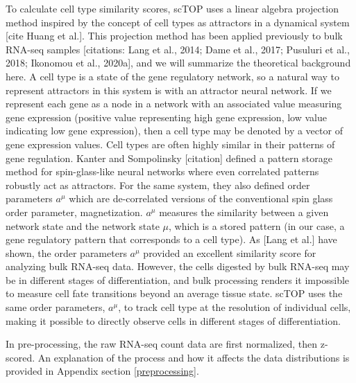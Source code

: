 \documentclass[aps,superscriptaddress, notitlepage,longbibliography]{revtex4-1}
\begin{document}
To calculate cell type similarity scores, scTOP uses a linear algebra projection method inspired by the concept of cell types as attractors in a dynamical system [cite Huang et al.]. This projection method has been applied previously to bulk RNA-seq samples [citations: Lang et al., 2014; Dame et al., 2017; Pusuluri et al., 2018; Ikonomou et al., 2020a], and we will summarize the theoretical background here. A cell type is a state of the gene regulatory network, so a natural way to represent attractors in this system is with an attractor neural network. If we represent each gene as a node in a network with an associated value measuring gene expression (positive value representing high gene expression, low value indicating low gene expression), then a cell type may be denoted by a vector of gene expression values. Cell types are often highly similar in their patterns of gene regulation. Kanter and Sompolinsky [citation] defined a pattern storage method for spin-glass-like neural networks where even correlated patterns robustly act as attractors. For the same system, they also defined order parameters $a^{\mu}$ which are de-correlated versions of the conventional spin glass order parameter, magnetization. $a^{\mu}$ measures the similarity between a given network state and the network state $\mu$, which is a stored pattern (in our case, a gene regulatory pattern that corresponds to a cell type). As [Lang et al.] have shown, the order parameters $a^{\mu}$ provided an excellent similarity score for analyzing bulk RNA-seq data. However, the cells digested by bulk RNA-seq may be in different stages of differentiation, and bulk processing renders it impossible to measure cell fate transitions beyond an average tissue state. scTOP uses the same order parameters, $a^{\mu}$, to track cell type at the resolution of individual cells, making it possible to directly observe cells in different stages of differentiation.

In pre-processing, the raw RNA-seq count data are first normalized, then z-scored. An explanation of the process and how it affects the data distributions is provided in Appendix section \ref{preprocessing}.
\end{document}
